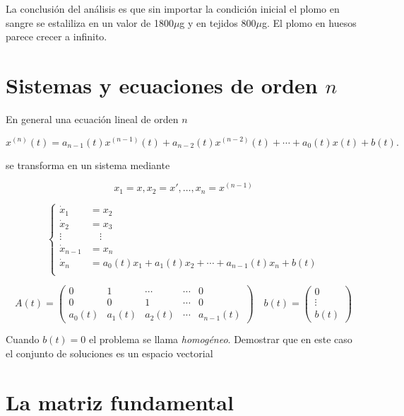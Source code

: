 La conclusión del análisis es que sin importar la condición inicial el plomo en sangre se estaliliza en un valor de 1800$\mu$g y en tejidos 800$\mu$g. El plomo en huesos parece crecer a infinito.






\section{Sistemas y ecuaciones de orden $n$}

En general una ecuación lineal de orden $n$

$$
x^{(n)}(t)=a_{n-1}(t) x^{(n-1)}(t)+a_{n-2}(t) x^{(n-2)}(t)+\cdots+a_{0}(t) x(t)+b(t).
$$

se transforma en un sistema mediante

$$x_{1}=x, x_{2}=x', \ldots, x_{n}=x^{(n-1)}$$


$$
\left\{
\begin{split}
\dot{x}_{1}&=x_{2} \\
\dot{x}_{2}&=x_{3} \\
\vdots &  \quad\vdots\\
\dot{x}_{n-1}&=x_{n} \\
\dot{x}_{n}&=a_{0}(t) x_{1}+a_{1}(t) x_{2}+\cdots+a_{n-1}(t) x_{n}+b(t)\\
\end{split}
\right.
$$

$$
A(t)=\begin{pmatrix}
0 & 1 & \cdots &\cdots& 0 \\
0 & 0 & 1 & \cdots & 0 \\
a_{0}(t) & a_{1}(t)&a_{2}(t) & \cdots & a_{n-1}(t)
\end{pmatrix}
\quad 
b(t)=\begin{pmatrix} 0\\
\vdots \\
b(t)
\end{pmatrix}
$$


\begin{ejercicio}{} Cuando $b(t)=0$ el problema se llama \emph{ homogéneo}. Demostrar que en este caso  el conjunto
de soluciones es un espacio vectorial 
\end{ejercicio}



 \section{La matriz fundamental}

